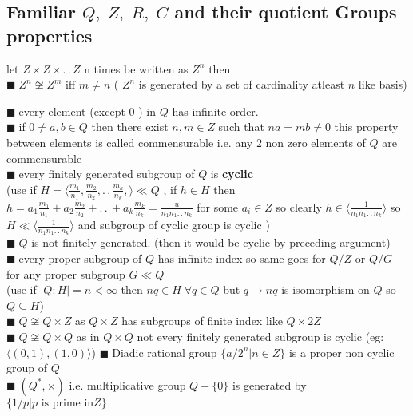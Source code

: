 \documentclass[11pt]{extarticle}
\newcommand{\ra}{\rightarrow}
\newcommand{\w}[1]{\text{#1}}
\newcommand{\ck}{.\,.\,}
\newcommand{\snote}[1]{{\footnotesize(#1)}}
\newcommand{\y}{$\blacksquare\;$}
\newcommand{\gen}[1]{\langle #1 \rangle}
\newcommand{\tbx}[2][]{
	\begin{tcolorbox}[enhanced,breakable,size=small,colback=black!2!white,title={#1},arc is angular, arc=1.5mm,drop fuzzy shadow]
		#2
	\end{tcolorbox}
}
\newcommand{\tm}{\times}
\begin{document}
\begin{multicols}{2}
\subsection{\small Familiar $ Q,\; Z,\; R,\; C $ and their quotient Groups properties }
\tbx[Z]{ let $ Z\tm Z\tm \ck Z $ n times be written as $ Z^n $ then\\
\y $ Z^n\not\cong Z^m $ iff $ m\neq n $ \snote{ $ Z^n $ is generated by a set of cardinality atleast $ n $ like basis}
 }
\tbx[$ Q $  ]{
\y every element \snote{except $ 0 $ } in $ Q $ has infinite order.\\
\y if $ 0\neq a,b \in Q $  then there exist $ n,m\in Z $ such that $ na=mb \neq 0$ this property between elements is called commensurable i.e. any $ 2 $ non zero elements of $ Q $ are commensurable\\
\y every finitely generated subgroup of $ Q$ is \textbf{cyclic}\\
\snote{use if $ H=\gen{\frac{ m_1 }{n_1},\frac{ m_2}{n_2},\ck \frac{ m_k }{n_k},} \ll Q   $ , if $ h\in H  $ then 
	$ h= a_1\frac{ m_1 }{n_1}+a_2\frac{ m_2}{n_2}+\ck+a_k \frac{ m_k }{n_k}= \frac{ u }{n_1n_1\ck n_k} $ for some $ a_i\in Z $  so clearly $ h\in \gen{\frac{ 1 }{n_1n_1\ck n_k} } $ so $ H\ll  \gen{\frac{ 1 }{n_1n_1\ck n_k}}$ and subgroup of cyclic group is cyclic }\\
\y $ Q $ is not finitely generated. \snote{then it would be cyclic by preceding argument}\\
\y every proper subgroup of $ Q $ has infinite index so same goes for $ Q/Z $ or $ Q/G $ for any proper subgroup $ G\ll Q $   \\
\snote{use if $ |Q:H|=n<\infty $  then $ nq\in H \; \forall q \in Q$ but $ q\ra nq $ is isomorphism on $ Q $ so $ Q\subseteq H $}\\
\y $ Q\not\cong Q\times Z $ as $ Q\times Z  $ has subgroups of finite index like $ Q\times 2Z  $ \\
\y $ Q\not\cong Q\times Q$ as in $ Q\times Q  $ not every finitely generated subgroup is cyclic \snote{eg: $\gen{(0,1),(1,0)}$}
\y Diadic rational group $ \{a/2^n|n\in Z\} $ is a proper non cyclic group of $ Q $ \\
\y $ (Q^*,\tm) $ i.e. multiplicative group $Q-\{0\} $ is generated by $ \{1/p|p \w{ is prime in} Z\} $ }


\end{multicols}
\end{document}
